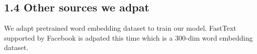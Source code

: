 \documentclass{article}
\begin{document}
\subsection*{1.4 Other sources we adpat}
We adapt pretrained word embedding dataset to train our model. FastText supported by Facebook is adpated this time which is a 300-dim word embedding dataset.



\nocite{*}
\end{document}
